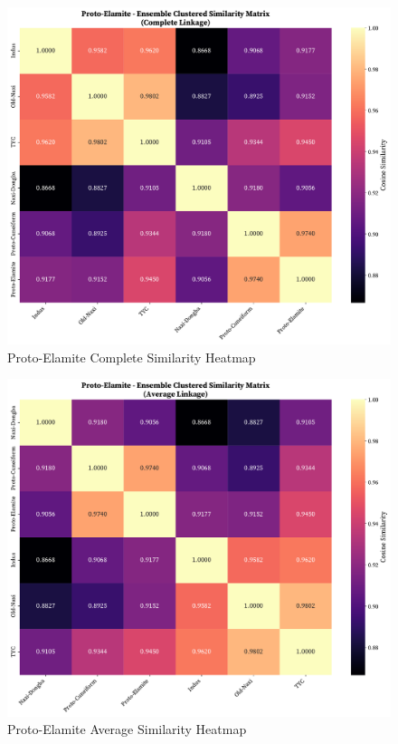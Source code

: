 \documentclass[11pt,a4paper,oneside]{report}
\begin{document}
\begin{figure}[H]
    \centering
    \includegraphics[width=0.75\linewidth]{Visualizations/Clustered Heatmaps/Proto-Elamite/ensemble_clustered_similarity_complete.pdf}
     \caption*{Proto-Elamite Complete Similarity Heatmap}
\end{figure}
\begin{figure}[H]
    \centering
    \includegraphics[width=0.75\linewidth]{Visualizations/Clustered Heatmaps/Proto-Elamite/ensemble_clustered_similarity_average.pdf}
     \caption*{Proto-Elamite Average Similarity Heatmap}
\end{figure}
\end{document}
